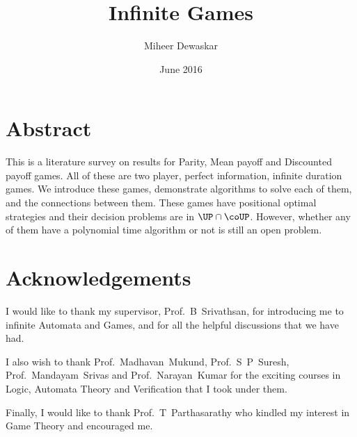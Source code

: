 \documentclass[11pt,a4paper,parskip=half,toc=bib,oneside]{scrbook}
\title{Infinite Games}
\author{Miheer Dewaskar}
\date{June 2016}
\begin{document}
\maketitle
\frontmatter

\chapter{Abstract}
    This is a literature survey on results for Parity, Mean payoff and Discounted payoff games. All of these are two player, perfect information, infinite duration games. We introduce these games, demonstrate algorithms to solve each of them, and the connections between them. These games have positional optimal strategies and their decision problems are in $\UP \cap \coUP$. However, whether any of them have a polynomial time algorithm or not is still an open problem.

\chapter{Acknowledgements}
I would like to thank my supervisor, Prof.~B~Srivathsan, for introducing me to infinite Automata and Games, and for all the helpful discussions that we have had.

I also wish to thank Prof.~Madhavan~Mukund, Prof.~S~P~Suresh, Prof.~Mandayam~Srivas and Prof.~Narayan~Kumar for the exciting courses in Logic, Automata Theory and Verification that I took under them.

Finally, I would like to thank Prof.~T~Parthasarathy who kindled my interest in Game Theory and encouraged me.

\tableofcontents

\mainmatter







\backmatter
\printbibliography
\end{document}
